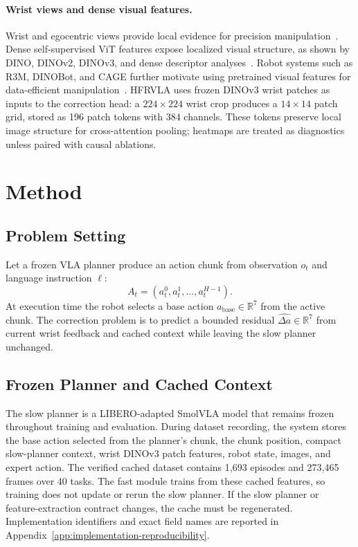 \documentclass[10pt]{article}
\newcommand{\method}{HFRVLA}
\newcommand{\smolvla}{SmolVLA}
\newcommand{\abase}{a_{\mathrm{base}}}
\newcommand{\deltah}{\hat{\Delta a}}
\begin{document}
\paragraph{Wrist views and dense visual features.}
Wrist and egocentric views provide local evidence for precision manipulation~\citep{jangir2022lookcloser,chuang2024activevision}. Dense self-supervised ViT features expose localized visual structure, as shown by DINO, DINOv2, DINOv3, and dense descriptor analyses~\citep{caron2021dino,oquab2023dinov2,simeoni2025dinov3,amir2021densevit}. Robot systems such as R3M, DINOBot, and CAGE further motivate using pretrained visual features for data-efficient manipulation~\citep{nair2023r3m,dipalo2024dinobot,xia2024cage}. \method{} uses frozen DINOv3 wrist patches as inputs to the correction head: a $224\times224$ wrist crop produces a $14\times14$ patch grid, stored as 196 patch tokens with 384 channels. These tokens preserve local image structure for cross-attention pooling; heatmaps are treated as diagnostics unless paired with causal ablations.

\section{Method}

\subsection{Problem Setting}

Let a frozen VLA planner produce an action chunk from observation $o_t$ and language instruction $\ell$:
\begin{equation}
  A_t = (a^0_t, a^1_t, \ldots, a^{H-1}_t).
\end{equation}
At execution time the robot selects a base action $\abase \in \mathbb{R}^7$ from the active chunk. The correction problem is to predict a bounded residual $\deltah\in\mathbb{R}^7$ from current wrist feedback and cached context while leaving the slow planner unchanged.

\subsection{Frozen Planner and Cached Context}

The slow planner is a LIBERO-adapted \smolvla{} model that remains frozen throughout training and evaluation. During dataset recording, the system stores the base action selected from the planner's chunk, the chunk position, compact slow-planner context, wrist DINOv3 patch features, robot state, images, and expert action. The verified cached dataset contains 1,693 episodes and 273,465 frames over 40 tasks. The fast module trains from these cached features, so training does not update or rerun the slow planner. If the slow planner or feature-extraction contract changes, the cache must be regenerated. Implementation identifiers and exact field names are reported in Appendix~\ref{app:implementation-reproducibility}.
\end{document}
